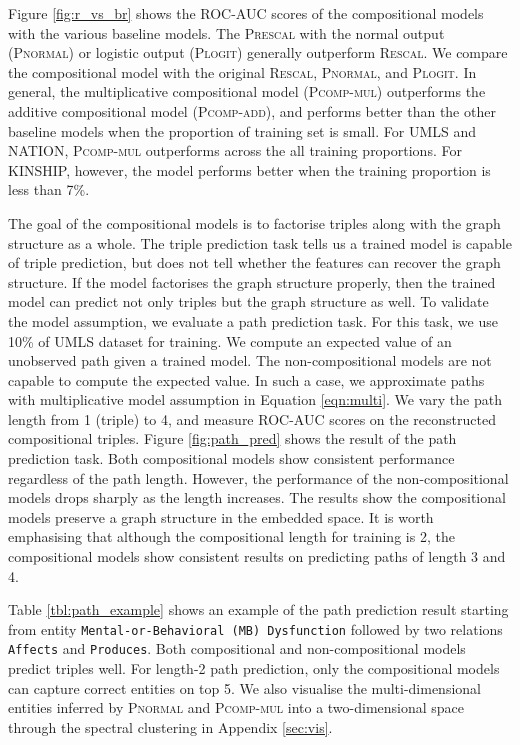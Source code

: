 Figure \ref{fig:r_vs_br} shows the ROC-AUC scores of the compositional models
with the various baseline models. The \textsc{Prescal} with
the normal output (\textsc{Pnormal}) or logistic output (\textsc{Plogit}) generally outperform \textsc{Rescal}.
We compare the compositional model with the original \textsc{Rescal}, \textsc{Pnormal}, and \textsc{Plogit}.
In general, the multiplicative compositional model (\textsc{Pcomp-mul}) outperforms
the additive compositional model (\textsc{Pcomp-add}), and performs better than the other baseline models
when the proportion of training set is small. For UMLS and NATION, \textsc{Pcomp-mul} outperforms
across the all training proportions.
For KINSHIP, however, the model performs better when the training proportion is less than 7\%.

The goal of the compositional models is to factorise triples along with the graph structure as a whole.
The triple prediction task tells us a trained model is capable of triple prediction,
but does not tell whether the features can recover the graph structure.
If the model factorises the graph structure properly,
then the trained model can predict not only triples but the graph structure as well.
To validate the model assumption, we evaluate a path prediction task.
For this task, we use 10\% of UMLS dataset for training.
We compute an expected value of an unobserved path given a trained model.
The non-compositional models are not capable to compute the expected value.
In such a case, we approximate paths with multiplicative model assumption in Equation \ref{eqn:multi}.
We vary the path length from 1 (triple) to 4, and measure ROC-AUC scores on the reconstructed compositional triples.
Figure \ref{fig:path_pred} shows the result of the path prediction task.
Both compositional models show consistent performance regardless of the path length.
However, the performance of the non-compositional models drops sharply as the length increases.
The results show the compositional models preserve a graph structure in the embedded space.
It is worth emphasising that although the compositional length for training is 2,
the compositional models show consistent results on predicting paths of length 3 and 4.

Table \ref{tbl:path_example} shows an example of the path prediction result
starting from entity \texttt{Mental-or-Behavioral (MB) Dysfunction} followed by two relations \texttt{Affects} and \texttt{Produces}.
Both compositional and non-compositional models predict triples well.
For length-2 path prediction, only the compositional models can capture correct entities on top 5.
We also visualise the multi-dimensional entities inferred by \textsc{Pnormal} and \textsc{Pcomp-mul}
into a two-dimensional space through the spectral clustering \cite{von2007tutorial}
in Appendix \ref{sec:vis}.


